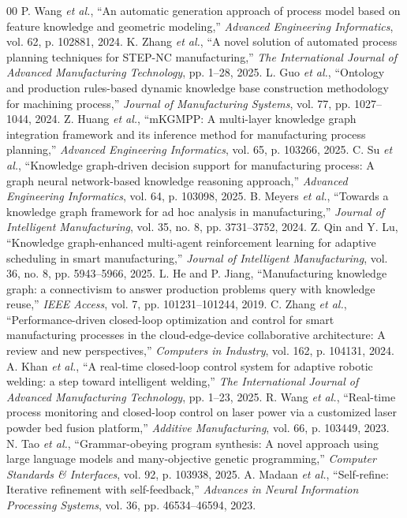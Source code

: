 \documentclass[journal,twoside,web]{ieeecolor}
\begin{document}
\begin{thebibliography}{00}
 P. Wang \emph{et al.}, ``An automatic generation approach of process model based on feature knowledge and geometric modeling,'' \emph{Advanced Engineering Informatics}, vol. 62, p. 102881, 2024.
 K. Zhang \emph{et al.}, ``A novel solution of automated process planning techniques for STEP-NC manufacturing,'' \emph{The International Journal of Advanced Manufacturing Technology}, pp. 1--28, 2025.
 L. Guo \emph{et al.}, ``Ontology and production rules-based dynamic knowledge base construction methodology for machining process,'' \emph{Journal of Manufacturing Systems}, vol. 77, pp. 1027--1044, 2024.
 Z. Huang \emph{et al.}, ``mKGMPP: A multi-layer knowledge graph integration framework and its inference method for manufacturing process planning,'' \emph{Advanced Engineering Informatics}, vol. 65, p. 103266, 2025.
 C. Su \emph{et al.}, ``Knowledge graph-driven decision support for manufacturing process: A graph neural network-based knowledge reasoning approach,'' \emph{Advanced Engineering Informatics}, vol. 64, p. 103098, 2025.
 B. Meyers \emph{et al.}, ``Towards a knowledge graph framework for ad hoc analysis in manufacturing,'' \emph{Journal of Intelligent Manufacturing}, vol. 35, no. 8, pp. 3731--3752, 2024.
 Z. Qin and Y. Lu, ``Knowledge graph-enhanced multi-agent reinforcement learning for adaptive scheduling in smart manufacturing,'' \emph{Journal of Intelligent Manufacturing}, vol. 36, no. 8, pp. 5943--5966, 2025.
 L. He and P. Jiang, ``Manufacturing knowledge graph: a connectivism to answer production problems query with knowledge reuse,'' \emph{IEEE Access}, vol. 7, pp. 101231--101244, 2019.
 C. Zhang \emph{et al.}, ``Performance-driven closed-loop optimization and control for smart manufacturing processes in the cloud-edge-device collaborative architecture: A review and new perspectives,'' \emph{Computers in Industry}, vol. 162, p. 104131, 2024.
 A. Khan \emph{et al.}, ``A real-time closed-loop control system for adaptive robotic welding: a step toward intelligent welding,'' \emph{The International Journal of Advanced Manufacturing Technology}, pp. 1--23, 2025.
 R. Wang \emph{et al.}, ``Real-time process monitoring and closed-loop control on laser power via a customized laser powder bed fusion platform,'' \emph{Additive Manufacturing}, vol. 66, p. 103449, 2023.
 N. Tao \emph{et al.}, ``Grammar-obeying program synthesis: A novel approach using large language models and many-objective genetic programming,'' \emph{Computer Standards \& Interfaces}, vol. 92, p. 103938, 2025.
 A. Madaan \emph{et al.}, ``Self-refine: Iterative refinement with self-feedback,'' \emph{Advances in Neural Information Processing Systems}, vol. 36, pp. 46534--46594, 2023.
\end{thebibliography}
\end{document}
